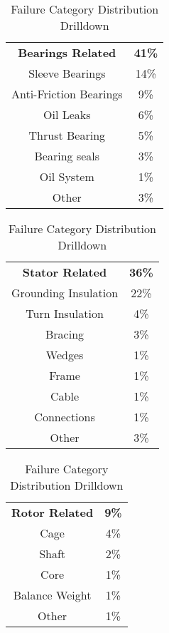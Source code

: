 \begin{table}[htbp]
\caption{Failure Category Distribution Drilldown}
\label{tab:failure_distribution_drilldown}
\begin{tabular}{cc}
\multicolumn{1}{c}{\textbf{Bearings Related}} & \multicolumn{1}{c}{\textbf{41\%}} \\
Sleeve Bearings & 14\% \\
Anti-Friction Bearings  & 9\% \\
Oil Leaks & 6\% \\
Thrust Bearing & 5\% \\
Bearing seals & 3\% \\
Oil System & 1\% \\
Other & 3\%
\end{tabular}
\begin{tabular}{cc}
\multicolumn{1}{c}{\textbf{Stator Related}} & \multicolumn{1}{c}{\textbf{36\%}} \\
Grounding Insulation & 22\% \\
Turn Insulation  & 4\% \\
Bracing & 3\% \\
Wedges & 1\% \\
Frame & 1\% \\
Cable & 1\% \\
Connections & 1\% \\
Other & 3\%
\end{tabular}
\begin{tabular}{cc}
\multicolumn{1}{c}{\textbf{Rotor Related}} & \multicolumn{1}{c}{\textbf{9\%}} \\
Cage & 4\% \\
Shaft  & 2\% \\
Core & 1\% \\
Balance Weight & 1\% \\
Other & 1\%
\end{tabular}
\end{table}
